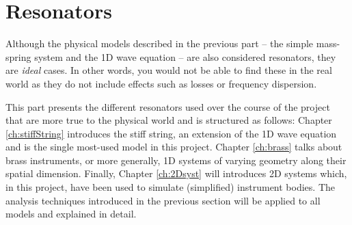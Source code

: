 \chapter*{Resonators}
Although the physical models described in the previous part -- the simple mass-spring system and the 1D wave equation -- are also considered resonators, they are \textit{ideal} cases. In other words, you would not be able to find these in the real world as they do not include effects such as losses or frequency dispersion. 

This part presents the different resonators used over the course of the project that are more true to the physical world and is structured as follows: Chapter \ref{ch:stiffString} introduces the stiff string, an extension of the 1D wave equation and is the single most-used model in this project. Chapter \ref{ch:brass} talks about brass instruments, or more generally, 1D systems of varying geometry along their spatial dimension. Finally, Chapter \ref{ch:2Dsyst} will introduces 2D systems which, in this project, have been used to simulate (simplified) instrument bodies. The analysis techniques introduced in the previous section will be applied to all models and explained in detail. 